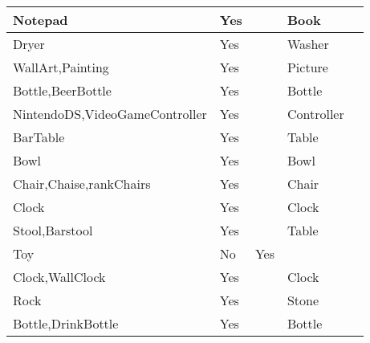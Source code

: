 \documentclass{article}
\begin{document}
\begin{longtable}{|l|l|l|l|l|}
Notepad                                  & Yes              &                                & Book           &                             \\ \hline
Dryer                                    & Yes              &                                & Washer         &                             \\ \hline
WallArt,Painting                         & Yes              &                                & Picture        &                             \\ \hline
Bottle,BeerBottle                        & Yes              &                                & Bottle         &                             \\ \hline
NintendoDS,VideoGameController           & Yes              &                                & Controller     &                             \\ \hline
BarTable                                 & Yes              &                                & Table          &                             \\ \hline
Bowl                                     & Yes              &                                & Bowl           &                             \\ \hline
Chair,Chaise,rankChairs                  & Yes              &                                & Chair          &                             \\ \hline
Clock                                    & Yes              &                                & Clock          &                             \\ \hline
Stool,Barstool                           & Yes              &                                & Table          &                             \\ \hline
Toy                                      & No               & Yes                            &                &                             \\ \hline
Clock,WallClock                          & Yes              &                                & Clock          &                             \\ \hline
Rock                                     & Yes              &                                & Stone          &                             \\ \hline
Bottle,DrinkBottle                       & Yes              &                                & Bottle         &                             \\ \hline

\end{longtable}
\end{document}
